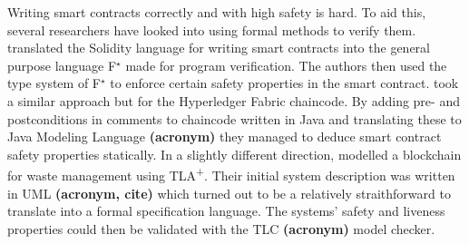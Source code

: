 \documentclass[english, biblatex, digitaloutput]{kththesis}
\begin{document}
Writing smart contracts correctly and with high safety is hard. To aid this, several researchers have looked into using formal methods to verify them. \textcite{bhargavan_formal_2016} translated the Solidity language for writing smart contracts into the general purpose language F$^{\star}$ made for program verification. The authors then used the type system of F$^{\star}$ to enforce certain safety properties in the smart contract. \textcite{beckert_formal_2018} took a similar approach but for the Hyperledger Fabric chaincode. By adding pre- and postconditions in comments to chaincode written in Java and translating these to Java Modeling Language \textbf{(acronym)} they managed to deduce smart contract safety properties statically. In a slightly different direction, \textcite{latif_blockchain_2019} modelled a blockchain for waste management using TLA\textsuperscript+. Their initial system description was written in UML \textbf{(acronym, cite)} which turned out to be a relatively straithforward to translate into a formal specification language. The systems' safety and liveness properties could then be validated with the TLC \textbf{(acronym)} model checker.





\end{document}

